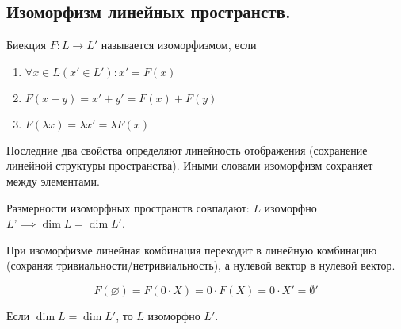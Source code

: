 \subsection{%
  Изоморфизм линейных пространств.%
}

\begin{definition}
  Биекция \(F \colon L \to L'\) называется изоморфизмом, если
  
  \begin{enumerate}
  \item
    \(\forall x \in L (x' \in L') \colon x' = F(x)\)
    
  \item
    \(F(x + y) = x' + y' = F(x) + F(y)\)
    
  \item
    \(F(\lambda x) = \lambda x' = \lambda F(x)\)
  \end{enumerate}
\end{definition}

\begin{remark}
  Последние два свойства определяют линейность отображения (сохранение линейной
  структуры пространства). Иными словами изоморфизм сохраняет 
  между элементами.
\end{remark}

\begin{remark}
  Размерности изоморфных пространств совпадают: \(L\) изоморфно \(L’ \implies
  \dim L = \dim L'\).
\end{remark}

\begin{remark}
  При изоморфизме линейная комбинация переходит в линейную комбинацию (сохраняя
  тривиальности/нетривиальность), а нулевой вектор в нулевой вектор.
  
  \begin{equation*}
    F(\varnothing)
    = F(0 \cdot X)
    = 0 \cdot F(X)
    = 0 \cdot X'
    = \emptyset'
  \end{equation*}
\end{remark}

\begin{theorem}
  Если \(\dim L = \dim L'\), то \(L\) изоморфно \(L'\).
\end{theorem}

